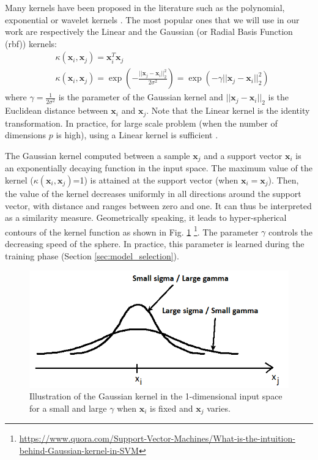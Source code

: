 Many kernels have been proposed in the literature such as the polynomial, exponential or wavelet kernels \cite{Schlkopf2013}. The most popular ones that we will use in our work are respectively the Linear and the Gaussian (or Radial Basis Function ({\sc rbf})) kernels:
\begin{align}
	& \kappa(\textbf{x}_i,\textbf{x}_j)= \textbf{x}_i ^T \textbf{x}_j \\
	& \kappa(\textbf{x}_i,\textbf{x}_j)
	= \exp\left( -\frac{||\textbf{x}_j-\textbf{x}_i||_2^2}{2\sigma^2}\right) 
	= \exp\left( -\gamma||\textbf{x}_j-\textbf{x}_i||_2^2\right) 
\end{align}
where $\gamma = \frac{1}{2\sigma^2}$ is the parameter of the Gaussian kernel and $||\textbf{x}_j-\textbf{x}_i||_2$ is the Euclidean distance between $\textbf{x}_i$ and $\textbf{x}_j$. Note that the Linear kernel is the identity transformation. In practice, for large scale problem (when the number of dimensions $p$ is high), using a Linear kernel is sufficient  \cite{Fan2008}.

The Gaussian kernel computed between a sample $\textbf{x}_j$ and a support vector $\textbf{x}_i$ is an exponentially decaying function in the input space. The maximum value of the kernel ($\kappa(\textbf{x}_i,\textbf{x}_j)$=1) is attained at the support vector (when $\textbf{x}_i=\textbf{x}_j$). Then, the value of the kernel decreases uniformly in all directions around the support vector, with distance and ranges between zero and one. It can thus be interpreted as a similarity measure. Geometrically speaking, it leads to hyper-spherical contours of the kernel function as shown in Fig. \ref{fig:Kernel_Gaussian} \footnote{\url{https://www.quora.com/Support-Vector-Machines/What-is-the-intuition-behind-Gaussian-kernel-in-SVM}}. The parameter $\gamma$ controls the decreasing speed of the sphere. In practice, this parameter is learned during the training phase (Section \ref{sec:model_selection}).

\begin{figure}[h!]
\centering
\includegraphics[width=0.6\linewidth]{images/Kernel_Gaussian2}
\caption{Illustration of the Gaussian kernel in the 1-dimensional input space for a small and large $\gamma$ when $\textbf{x}_i$ is fixed and $\textbf{x}_j$ varies.}
\label{fig:Kernel_Gaussian}
\end{figure}


